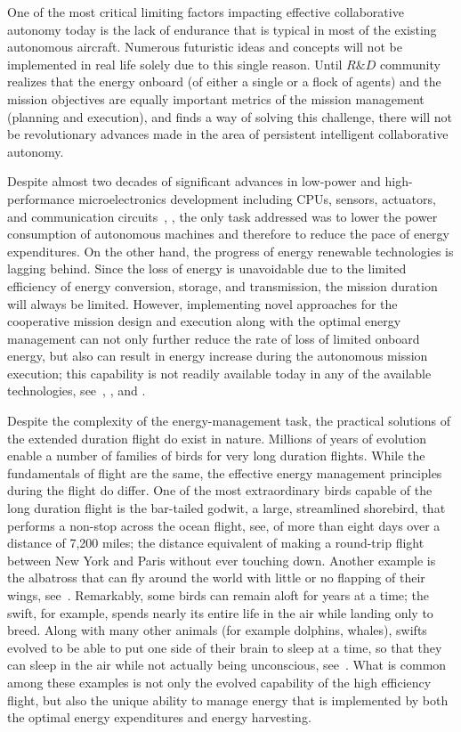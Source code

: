 \documentclass{ifacconf}
\begin{document}
One of the most critical limiting factors impacting effective collaborative autonomy today is the lack of endurance that is typical in most of the existing autonomous aircraft. Numerous futuristic ideas and concepts will not be implemented in real life solely due to this single reason. Until $R\&D$ community realizes that the energy onboard (of either a single or a flock of agents) and the mission objectives are equally important metrics of the mission management (planning and execution), and finds a way of solving this challenge, there will not be revolutionary advances made in the area of persistent intelligent collaborative autonomy.

Despite almost two decades of significant advances in low-power and high-performance microelectronics development including CPUs, sensors, actuators, and communication circuits~\cite{Tong:1995}, \cite{Singh:2010}, the only task addressed was to lower the power consumption of autonomous machines and therefore to reduce the pace of energy expenditures. On the other hand, the progress of energy renewable technologies is lagging behind. Since the loss of energy is unavoidable due to the limited efficiency of energy conversion, storage, and transmission, the mission duration will always be limited. However, implementing novel approaches for the cooperative mission design and execution along with the optimal energy management can not only further reduce the rate of loss of limited onboard energy, but also can result in energy increase during the autonomous mission execution; this capability is not readily available today in any of the available technologies, see~\cite{Siciliano:2008}, \cite{Martinez:2008}, and \cite{Nonami:2013}.

Despite the complexity of the energy-management task, the practical solutions of the extended duration flight do exist in nature. Millions of years of evolution enable a number of families of birds for very long duration flights. While the fundamentals of flight are the same, the effective energy management principles during the flight do differ. One of the most extraordinary birds capable of the long duration flight is the bar-tailed godwit, a large, streamlined shorebird, that performs a non-stop across the ocean flight, see\cite{USGS:2007}, of more than eight days over a distance of 7,200 miles; the distance equivalent of making a round-trip flight between New York and Paris without ever touching down. Another example is the albatross that can fly around the world with little or no flapping of their wings, see~\cite{Richardson:2011}. Remarkably, some birds can remain aloft for years at a time; the swift, for example, spends nearly its entire life in the air while landing only to breed. Along with many other animals (for example dolphins, whales), swifts evolved to be able to put one side of their brain to sleep at a time, so that they can sleep in the air while not actually being unconscious, see~\cite{Lapierre:2007}. What is common among these examples is not only the evolved capability of the high efficiency flight, but also the unique ability to manage energy that is implemented by both the optimal energy expenditures and energy harvesting.
\end{document}
